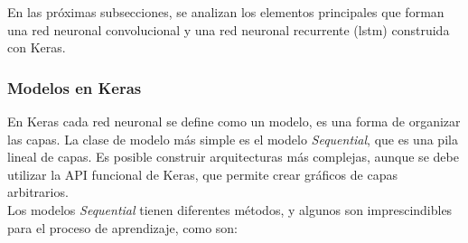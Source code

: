 En las próximas subsecciones, se analizan los elementos principales que forman una red neuronal convolucional y una red neuronal recurrente (\acrshort{lstm}) construida con Keras.


\subsubsection{Modelos en Keras}

En Keras cada red neuronal se define como un modelo, es una forma de organizar las capas. La clase de modelo más simple es el modelo \textit{Sequential}, que es una pila lineal de capas. Es posible construir arquitecturas más complejas, aunque se debe utilizar la API funcional de Keras, que permite crear gráficos de capas arbitrarios.\\

Los modelos \textit{Sequential} tienen diferentes métodos, y algunos son imprescindibles para el proceso de aprendizaje, como son:

